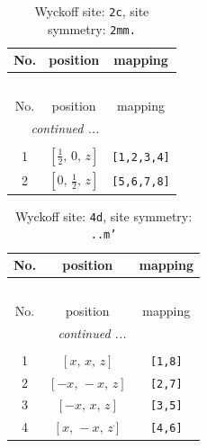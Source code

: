 \documentclass[fleqn,8pt]{jsarticle}
\begin{document}
\begin{longtable}{ccc}
\caption{Wyckoff site: {\tt 2c}, site symmetry: {\tt 2mm.}}
 \\
 \hline \hline
No. & position & mapping \\ \hline \endfirsthead

\multicolumn{2}{l}{\tablename\ \thetable{}} \\
 \hline \hline
No. & position & mapping \\ \hline \endhead

 \hline \hline
\multicolumn{2}{r}{\footnotesize\it continued ...} \\ \endfoot

 \hline \hline
\multicolumn{2}{r}{} \\ \endlastfoot

1 & $\left[ \frac{1}{2},\, 0,\, z \right]$ & {\tt [1,2,3,4]} \\ \hline
2 & $\left[ 0,\, \frac{1}{2},\, z \right]$ & {\tt [5,6,7,8]} \\
\end{longtable}
\renewcommand{\arraystretch}{1.2}
\begin{longtable}{ccc}
\caption{Wyckoff site: {\tt 4d}, site symmetry: {\tt ..m'}}
 \\
 \hline \hline
No. & position & mapping \\ \hline \endfirsthead

\multicolumn{2}{l}{\tablename\ \thetable{}} \\
 \hline \hline
No. & position & mapping \\ \hline \endhead

 \hline \hline
\multicolumn{2}{r}{\footnotesize\it continued ...} \\ \endfoot

 \hline \hline
\multicolumn{2}{r}{} \\ \endlastfoot

1 & $\left[ x,\, x,\, z \right]$ & {\tt [1,8]} \\ \hline
2 & $\left[ - x,\, - x,\, z \right]$ & {\tt [2,7]} \\ \hline
3 & $\left[ - x,\, x,\, z \right]$ & {\tt [3,5]} \\ \hline
4 & $\left[ x,\, - x,\, z \right]$ & {\tt [4,6]} \\
\end{longtable}
\renewcommand{\arraystretch}{1.2}
\end{document}
